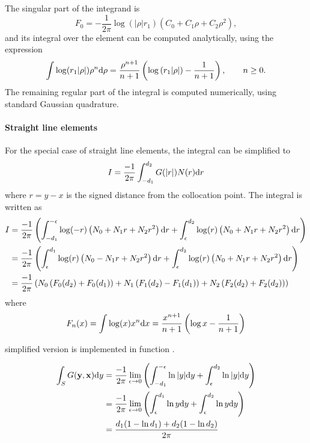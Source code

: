 The singular part of the integrand is
%
\begin{equation}
	F_0 = -\frac{1}{2\pi} \log \left(|\rho| r_1\right) \left( C_0 + C_1 \rho + C_2 \rho^2 \right)
	,
\end{equation}
%
and its integral over the element can be computed analytically, using the expression
%
\begin{equation}
	\int \log(r_1 |\rho|) \rho^n \mathrm{d} \rho = \frac{\rho^{n+1}}{n+1} \left( \log\left(r_1 |\rho|\right) - \frac{1}{n+1} \right)
	, \qquad n \ge 0
	.
\end{equation}
%
The remaining regular part of the integral is computed numerically, using standard Gaussian quadrature.


\paragraph{Straight line elements}

For the special case of straight line elements, the integral can be simplified to
%
\begin{equation}
	I = \frac{-1}{2\pi} \int_{-d_1}^{d_2} G(|r|) N(r) \mathrm{d} r
\end{equation}
%
where $r = y-x$ is the signed distance from the collocation point.
The integral is written as
%
\begin{align}
	I 
	&= \frac{-1}{2\pi} \left(
		\int_{-d_1}^{-\epsilon} \log(-r) \left(N_0 + N_1 r + N_2 r^2 \right) \mathrm{d} r
		+
		\int_{\epsilon}^{d_2} \log(r) \left(N_0 + N_1 r + N_2 r^2 \right) \mathrm{d} r
	\right) \\
	&= \frac{-1}{2\pi} \left(
		\int_{\epsilon}^{d_1} \log(r) \left(N_0 - N_1 r + N_2 r^2 \right) \mathrm{d} r
		+
		\int_{\epsilon}^{d_2} \log(r) \left(N_0 + N_1 r + N_2 r^2 \right) \mathrm{d} r
	\right) \\
	&= 
	\frac{-1}{2\pi} \left(
		N_0 \left(F_0(d_2) + F_0(d_1)\right) +
		N_1 \left(F_1(d_2) - F_1(d_1)\right) +
		N_2 \left(F_2(d_2) + F_2(d_2)\right)
	\right)
\end{align}
%
where
%
\begin{equation}
	F_n(x) = \int \log(x) x^n \mathrm{d} x
	= \frac{x^{n+1}}{n+1} \left(\log x - \frac{1}{n+1}\right)
\end{equation}


simplified version is implemented in function .


\begin{align}
\int_{S} G({\bf y}, {\bf x}) \mathrm{d} y
& = \frac{-1}{2\pi}\lim_{\epsilon \to 0}
\left( \int_{-d_1}^{-\epsilon} \ln |y| \mathrm{d} y + \int_{\epsilon}^{d_2}  \ln |y| \mathrm{d} y \right) \nonumber \\
& = \frac{-1}{2\pi}\lim_{\epsilon \to 0}
\left( \int_{\epsilon}^{d_1} \ln y \mathrm{d} y + \int_{\epsilon}^{d_2}  \ln y \mathrm{d} y \right) \nonumber \\
&=
\frac{d_1(1-\ln d_1) + d_2(1-\ln d_2)}{2\pi}
\end{align}



